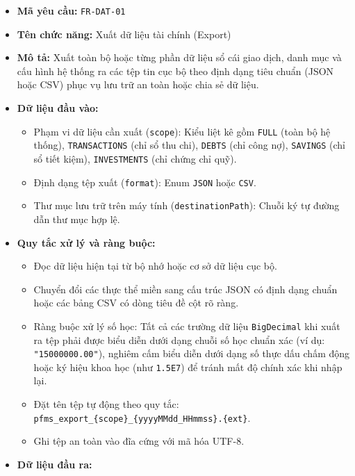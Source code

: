 \documentclass[11pt,a4paper]{article}
\providecommand{\tightlist}{
  \setlength{\itemsep}{0pt}\setlength{\parskip}{0pt}}
\begin{document}
\begin{itemize}
\tightlist
\item
  \textbf{Mã yêu cầu:} \texttt{FR-DAT-01}
\item
  \textbf{Tên chức năng:} Xuất dữ liệu tài chính (Export)
\item
  \textbf{Mô tả:} Xuất toàn bộ hoặc từng phần dữ liệu sổ cái giao dịch,
  danh mục và cấu hình hệ thống ra các tệp tin cục bộ theo định dạng
  tiêu chuẩn (JSON hoặc CSV) phục vụ lưu trữ an toàn hoặc chia sẻ dữ
  liệu.
\item
  \textbf{Dữ liệu đầu vào:}

  \begin{itemize}
  \tightlist
  \item
    Phạm vi dữ liệu cần xuất (\texttt{scope}): Kiểu liệt kê gồm
    \texttt{FULL} (toàn bộ hệ thống), \texttt{TRANSACTIONS} (chỉ sổ thu
    chi), \texttt{DEBTS} (chỉ công nợ), \texttt{SAVINGS} (chỉ sổ tiết
    kiệm), \texttt{INVESTMENTS} (chỉ chứng chỉ quỹ).
  \item
    Định dạng tệp xuất (\texttt{format}): Enum \texttt{JSON} hoặc
    \texttt{CSV}.
  \item
    Thư mục lưu trữ trên máy tính (\texttt{destinationPath}): Chuỗi ký
    tự đường dẫn thư mục hợp lệ.
  \end{itemize}
\item
  \textbf{Quy tắc xử lý và ràng buộc:}

  \begin{itemize}
  \tightlist
  \item
    Đọc dữ liệu hiện tại từ bộ nhớ hoặc cơ sở dữ liệu cục bộ.
  \item
    Chuyển đổi các thực thể miền sang cấu trúc JSON có định dạng chuẩn
    hoặc các bảng CSV có dòng tiêu đề cột rõ ràng.
  \item
    Ràng buộc xử lý số học: Tất cả các trường dữ liệu
    \texttt{BigDecimal} khi xuất ra tệp phải được biểu diễn dưới dạng
    chuỗi số học chuẩn xác (ví dụ: \texttt{"15000000.00"}), nghiêm cấm
    biểu diễn dưới dạng số thực dấu chấm động hoặc ký hiệu khoa học (như
    \texttt{1.5E7}) để tránh mất độ chính xác khi nhập lại.
  \item
    Đặt tên tệp tự động theo quy tắc:
    \texttt{pfms\_export\_\{scope\}\_\{yyyyMMdd\_HHmmss\}.\{ext\}}.
  \item
    Ghi tệp an toàn vào đĩa cứng với mã hóa UTF-8.
  \end{itemize}
\item
  \textbf{Dữ liệu đầu ra:}


\end{itemize}
\end{document}
